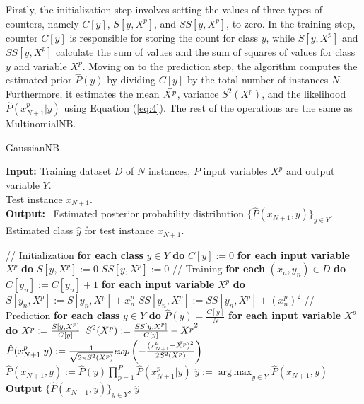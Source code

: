 \documentclass[10pt]{reportMaster}
\DeclareMathOperator*{\argmax}{arg\,max}
\begin{document}
\noindent Firstly, the initialization step involves setting the values of three types of counters, namely $C[y]$, $S[y,X^p]$, and $SS[y,X^p]$, to zero. In the training step, counter $C[y]$ is responsible for storing the count for class $y$, while $S[y,X^p]$ and $SS[y,X^p]$ calculate the sum of values and the sum of squares of values for class $y$ and variable $X^p$. Moving on to the prediction step, the algorithm computes the estimated prior $\hat{P}(y)$ by dividing $C[y]$ by the total number of instances $N$. Furthermore, it estimates the mean $\Bar{X^p}$, variance $S^2(X^p)$, and the likelihood $\hat{P}(x_{N+1}^p|y)$ using Equation (\ref{eq:4}). The rest of the operations are the same as MultinomialNB.


\begin{algorithm}[H]
\caption{GaussianNB}\label{alg:GaussianNB}
\textbf{Input:} \; \; Training dataset $D$ of $N$ instances, $P$ input variables $X^p$ and output variable $Y$.\\
\hspace*{\algorithmicindent} \quad \quad \; \; Test instance $x_{N+1}$.\\
\textbf{Output:} \,  Estimated posterior probability distribution $\{ \hat{P}(x_{N+1},y)\}_{y \in Y}$.\\
\hspace*{\algorithmicindent} \quad \quad \; \; Estimated class $\hat{y}$ for test instance $x_{N+1}$.

\begin{algorithmic}[1]
\State // Initialization
\State \textbf{for each class} $y \in Y$ \textbf{do}
\State \qquad $C[y] := 0$
\State \qquad \textbf{for each input variable} $X^p$ \textbf{do}
\State \qquad \qquad $S[y,X^p] := 0$
\State \qquad \qquad $SS[y,X^p] := 0$
\State // Training
\State \textbf{for each} $(x_n,y_n) \in D$ \textbf{do}
\State \qquad $C[y_n] := C[y_n]+1$
\State \qquad \textbf{for each input variable} $X^p$ \textbf{do}
\State \qquad \qquad $S[y_n,X^p] := S[y_n,X^p] + x_n^p$
\State \qquad \qquad $SS[y_n,X^p] := SS[y_n,X^p] + (x_n^p)^2$
\State // Prediction
\State \textbf{for each class} $y \in Y$ \textbf{do}
\State \qquad $\hat{P}(y) = \frac{C[y]}{N}$
\State \qquad \textbf{for each input variable} $X^p$ \textbf{do}
\State \qquad \qquad $\Bar{X^p}:=\frac{S[y,X^p]}{C[y]}$
\State \qquad \qquad $S^2(X^p):=\frac{SS[y,X^p]}{C[y]}-\Bar{X^p}^2$
\State \qquad \qquad $\hat{P}(x_{N+1}^p|y):=\frac{1}{\sqrt{2 \pi S^2(X^p)}}exp\left(-\frac{(x_{N+1}^p-\Bar{X^p})^2}{2S^2(X^p)}\right)$
\State \qquad $\hat{P}(x_{N+1},y):=\hat{P}(y) \prod_{p=1}^P \hat{P}(x_{N+1}^p|y)$
\State $\hat{y}:=\argmax_{y \in Y} \hat{P}(x_{N+1},y)$
\State \textbf{Output} $\{\hat{P}(x_{N+1},y)\}_{y \in Y}$, $\hat{y}$
\end{algorithmic}
\end{algorithm}
\end{document}

